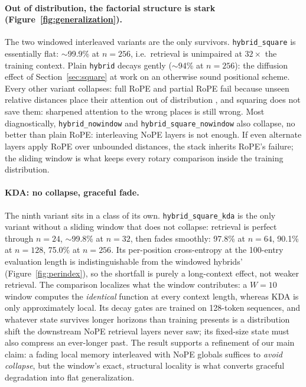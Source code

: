 \documentclass[10pt]{article}
\begin{document}
\paragraph{Out of distribution, the factorial structure is stark
(Figure~\ref{fig:generalization}).} The two windowed interleaved variants
are the only survivors. \texttt{hybrid\_square} is essentially flat:
$\sim$99.9\% at $n=256$, i.e.\ retrieval is unimpaired at $32\times$ the
training context. Plain \texttt{hybrid} decays gently ($\sim$94\% at $n=256$): the diffusion effect of Section~\ref{sec:square} at work on
an otherwise sound positional scheme. Every other variant collapses:
full RoPE and partial RoPE fail because unseen relative distances place
their attention out of distribution
\citep{su2021roformer,press2021train,kazemnejad2023impact}, and squaring does not save them: sharpened attention to the wrong places is still
wrong. Most diagnostically, \texttt{hybrid\_nowindow} and
\texttt{hybrid\_square\_nowindow} also collapse, no better than plain
RoPE: interleaving NoPE layers is not enough. If even alternate layers
apply RoPE over unbounded distances, the stack inherits RoPE's failure;
the sliding window is what keeps every rotary comparison inside the
training distribution.

\paragraph{KDA: no collapse, graceful fade.} The ninth variant sits in a
class of its own. \texttt{hybrid\_square\_kda} is the only variant
without a sliding window that does not collapse: retrieval is perfect
through $n=24$, $\sim$99.8\% at $n=32$, then fades smoothly: 97.8\% at
$n=64$, 90.1\% at $n=128$, 75.0\% at $n=256$. Its per-position
cross-entropy at the 100-entry evaluation length is indistinguishable
from the windowed hybrids' (Figure~\ref{fig:perindex}), so the shortfall
is purely a long-context effect, not weaker retrieval. The comparison
localizes what the window contributes: a $W=10$ window computes the
\emph{identical} function at every context length, whereas KDA is only
approximately local. Its decay gates are trained on 128-token sequences,
and whatever state survives longer horizons than training presents is a
distribution shift the downstream NoPE retrieval layers never saw; its
fixed-size state must also compress an ever-longer past. The result
supports a refinement of our main claim: a fading local memory
interleaved with NoPE globals suffices to \emph{avoid collapse}, but the
window's exact, structural locality is what converts graceful
degradation into flat generalization.
\end{document}
